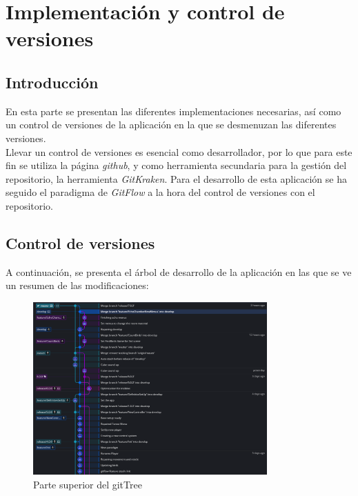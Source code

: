 \section{Implementación y control de versiones}

\subsection{Introducción}

\quad En esta parte se presentan las diferentes implementaciones necesarias, así como un control de versiones de la aplicación en la que se desmenuzan las diferentes versiones. \\

\quad Llevar un control de versiones es esencial como desarrollador, por lo que para este fin se utiliza la página \textit{github}, y como herramienta secundaria para la gestión del repositorio, la herramienta \textit{GitKraken}. Para el desarrollo de esta aplicación se ha seguido el paradigma de \textit{GitFlow} a la hora del control de versiones con el repositorio.\\

\subsection{Control de versiones}

\quad A continuación, se presenta el árbol de desarrollo de la aplicación en las que se ve un resumen de las modificaciones:

\begin{figure}[htb]
	\centering
	\includegraphics[width=0.8\textwidth]{./imagenes/git-tree1}
	\caption{Parte superior del gitTree}
\end{figure}
\FloatBarrier

